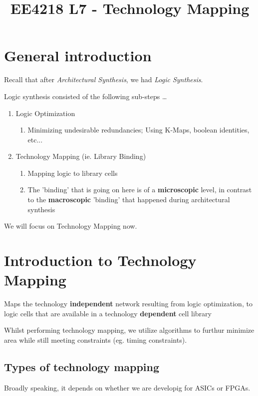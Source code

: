 \documentclass{article}
\title{\vspace{-2cm} EE4218 L7 - Technology Mapping}
\date{\vspace{-5ex}}
\begin{document}
\maketitle

\section{General introduction}
Recall that after \textit{Architectural Synthesis}, we had \textit{Logic Synthesis}.

Logic synthesis consisted of the following sub-steps \dots
\begin{enumerate}[label*=\arabic*.]
    \item Logic Optimization
        \begin{enumerate}[label*=\arabic*.]
            \item Minimizing undesirable redundancies; Using K-Maps, boolean identities, etc...
        \end{enumerate}
    \item Technology Mapping (ie. Library Binding)
        \begin{enumerate}[label*=\arabic*.]
            \item Mapping logic to library cells
            \item The 'binding' that is going on here is of a \textbf{microscopic} level, in contrast to the \textbf{macroscopic} 'binding' that happened during architectural synthesis
        \end{enumerate}
\end{enumerate}

We will focus on Technology Mapping now.

\section{Introduction to Technology Mapping}
Maps the technology \textbf{independent} network resulting from logic optimization,
to logic cells that are available in a technology \textbf{dependent} cell library

Whilst performing technology mapping, we utilize algorithms to furthur minimize area while still meeting constraints (eg. timing constraints).

\subsection{Types of technology mapping}
Broadly speaking, it depends on whether we are developig for ASICs or FPGAs.
\end{document}
